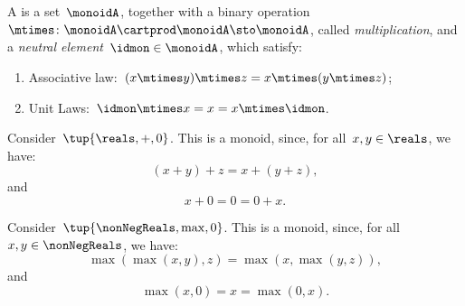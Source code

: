 

\section{}
\label{sec:parallelism-monoids}
\begin{definition}[Monoid]
  \label{def:monoid}
  A \emph{} is a set~$\monoidA$, together with a binary operation~$\mtimes \colon \monoidA \cartprod \monoidA \sto \monoidA$, called \emph{multiplication}, and a \emph{neutral element}~$\idmon\in \monoidA$, which satisfy:
  \begin{enumerate}
    \item Associative law:~$(x\mtimes y)\mtimes z=x\mtimes (y\mtimes z)$;
    \item Unit Laws:~$\idmon\mtimes x=x=x\mtimes \idmon$.
  \end{enumerate}
\end{definition}
\begin{example}
  Consider~$\tup{\reals,+,0}$. This is a monoid, since, for all~$x,y\in \reals$, we have:
  \begin{equation*}
  (x+y)
    +z=x+(y+z),
  \end{equation*}
  and
  \begin{equation*}
    x+0=0=0+x.
  \end{equation*}
\end{example}

\begin{example}
  Consider~$\tup{\nonNegReals,\max,0}$. This is a monoid, since, for all~$x,y\in \nonNegReals$, we have:
  \begin{equation*}
    \max(\max(x,y),z)=\max(x,\max(y,z)),
  \end{equation*}
  and
  \begin{equation*}
    \max(x,0)=x=\max(0,x).
  \end{equation*}
\end{example}

